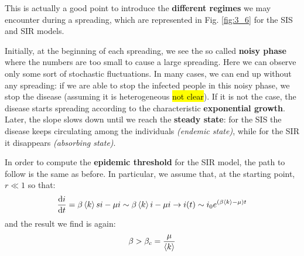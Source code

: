 \documentclass[../main/main.tex]{subfiles}
\begin{document}
This is actually a good point to introduce the \textbf{different regimes} we may encounter during a spreading, which are represented in Fig. \ref{fig:3_6} for the SIS and SIR models.

Initially, at the beginning of each spreading, we see the so called \textbf{noisy phase} where the numbers are too small to cause a large spreading. Here we can observe only some sort of stochastic fluctuations. In many cases, we can end up without any spreading: if we are able to stop the infected people in this noisy phase, we stop the disease (assuming it is heterogeneous \hl{not clear}). If it is not the case, the disease starts spreading according to the characteristic \textbf{exponential growth}. Later, the slope slows down until we reach the \textbf{steady state}: for the SIS the disease keeps circulating among the individuals \textit{(endemic state)}, while for the SIR it disappears \textit{(absorbing state)}.

In order to compute the \textbf{epidemic threshold} for the SIR model, the path to follow is the same as before. In particular, we assume that, at the starting point, $ r \ll 1 $ so that:
\begin{equation*}
  \dv{i}{t} = \beta \expval{k} s i - \mu i \sim \beta \expval{k} i - \mu i \rightarrow i(t) \sim i_0 e^{(\beta \expval{k} - \mu  )t}
\end{equation*}
and the result we find is again:
\begin{equation}
  \beta > \beta _c = \frac{\mu }{\expval{k} }
\end{equation}
\end{document}
